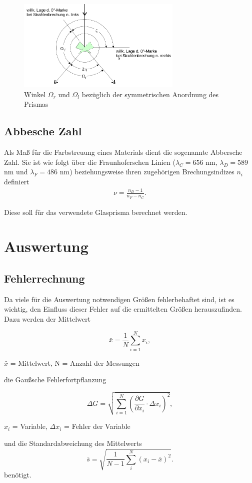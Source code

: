 \begin{figure}[H]
\includegraphics[width=0.7\textwidth]{pics/prisma_ohm1.png}
\caption{Winkel $\Omega_r$ und $\Omega_l$ bezüglich der symmetrischen Anordnung des Prismas}
\label{pic:prisma_ohmlr}
\end{figure}
	
\subsection{Abbesche Zahl}
	Als Maß für die Farbstreuung eines Materials dient die sogenannte Abbersche Zahl. Sie ist wie folgt über die Fraunhoferschen Linien ($\lambda_C = 656$ nm, $\lambda_D = 589$ nm und $\lambda_F = 486$ nm) beziehungsweise ihren zugehörigen Brechungsindizes $n_i$ definiert
\begin{align}
\nu = \frac{n_D -1 }{n_F - n_C}.
\label{eq_abbe}
\end{align}

Diese soll für das verwendete Glasprisma berechnet werden.

\section{Auswertung}
\subsection{Fehlerrechnung}
Da viele für die Auswertung notwendigen Größen fehlerbehaftet sind, ist es wichtig, den Einfluss dieser Fehler auf die ermittelten
Größen herauszufinden. Dazu werden der Mittelwert
\begin{formel}[H]
\begin{equation}
 \bar{x} = \frac1N \sum_{i=1}^{N} x_i,
 \label{eq_mittel}
\end{equation}
\caption*{\small{$\bar{x}$ = Mittelwert, N = Anzahl der Messungen}}
\end{formel}
die Gaußsche Fehlerfortpflanzung
\begin{formel}[H]
\begin{equation}
\Delta G = \sqrt{\sum_{i=1}^{N}\left( \frac{\partial G}{\partial x_i}\cdot \Delta x_i\right)^2},
\label{gauss}
\end{equation}
\caption*{$x_i$ = Variable, $\Delta x_i$ = Fehler der Variable}
\end{formel}
und die Standardabweichung des Mittelwerts
\begin{equation}
 \bar s = \sqrt{\frac{1}{N-1} \sum_{i}^{N} (x_i - \bar{x})^2}.
 \label{eq_standard}
\end{equation}
 benötigt.
